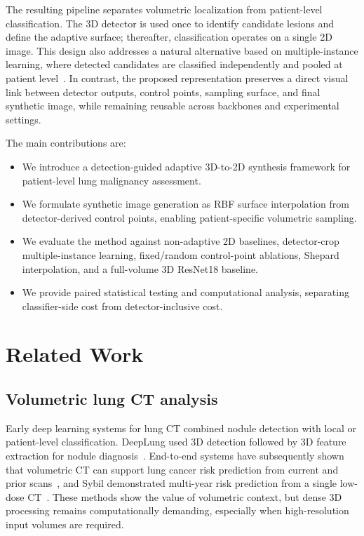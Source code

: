 \documentclass[preprint,12pt]{elsarticle}
\begin{document}
The resulting pipeline separates volumetric localization from patient-level classification. The 3D detector is used once to identify candidate lesions and define the adaptive surface; thereafter, classification operates on a single 2D image. This design also addresses a natural alternative based on multiple-instance learning, where detected candidates are classified independently and pooled at patient level~\cite{ilse2018attention}. In contrast, the proposed representation preserves a direct visual link between detector outputs, control points, sampling surface, and final synthetic image, while remaining reusable across backbones and experimental settings.

The main contributions are:
\begin{itemize}
    \item We introduce a detection-guided adaptive 3D-to-2D synthesis framework for patient-level lung malignancy assessment.
    \item We formulate synthetic image generation as RBF surface interpolation from detector-derived control points, enabling patient-specific volumetric sampling.
    \item We evaluate the method against non-adaptive 2D baselines, detector-crop multiple-instance learning, fixed/random control-point ablations, Shepard interpolation, and a full-volume 3D ResNet18 baseline.
    \item We provide paired statistical testing and computational analysis, separating classifier-side cost from detector-inclusive cost.
\end{itemize}

\section{Related Work}

\subsection{Volumetric lung CT analysis}

Early deep learning systems for lung CT combined nodule detection with local or patient-level classification. DeepLung used 3D detection followed by 3D feature extraction for nodule diagnosis~\cite{zhu2018deeplung}. End-to-end systems have subsequently shown that volumetric CT can support lung cancer risk prediction from current and prior scans~\cite{ardila2019endtoend}, and Sybil demonstrated multi-year risk prediction from a single low-dose CT~\cite{mikhael2023sybil}. These methods show the value of volumetric context, but dense 3D processing remains computationally demanding, especially when high-resolution input volumes are required.
\end{document}
